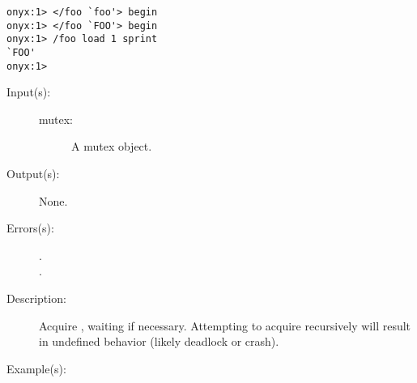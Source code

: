 \begin{description}
\begin{description}
\begin{verbatim}
onyx:1> </foo `foo'> begin
onyx:1> </foo `FOO'> begin
onyx:1> /foo load 1 sprint
`FOO'
onyx:1>
		\end{verbatim}
	\end{description}
\label{systemdict:lock}
\item[{\onyxop{mutex}{lock}{--}}: ]
	\begin{description}\item[]
	\item[Input(s): ]
		\begin{description}\item[]
		\item[mutex: ]
			A mutex object.
		\end{description}
	\item[Output(s): ] None.
	\item[Errors(s): ]
		\begin{description}\item[]
		\item[.]
		\item[.]
		\end{description}
	\item[Description: ]
		Acquire , waiting if necessary.  Attempting to
		acquire  recursively will result in undefined
		behavior (likely deadlock or crash).
	\item[Example(s): ]\begin{verbatim}


\end{verbatim}
\end{description}
\end{description}
